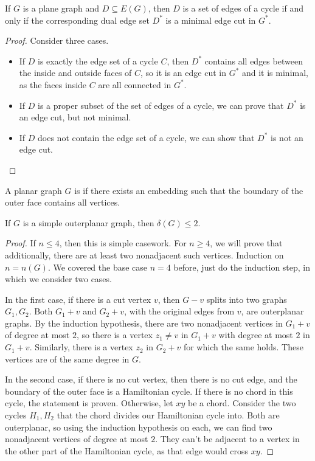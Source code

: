 \begin{theorem}
  If $G$ is a plane graph and $D \subseteq E(G)$, then $D$ is a set of edges of
  a cycle if and only if the corresponding dual edge set $D^*$ is a minimal edge
  cut in $G^*$.
\end{theorem}

\begin{proof}
  Consider three cases.
  \begin{itemize}
  \item If $D$ is exactly the edge set of a cycle $C$, then $D^*$ contains all
	edges between the inside and outside faces of $C$, so it is an edge cut in
	$G^*$ and it is minimal, as the faces inside $C$ are all connected in $G^*$.
  \item If $D$ is a proper subset of the set of edges of a cycle, we can prove
	that $D^*$ is an edge cut, but not minimal.
  \item If $D$ does not contain the edge set of a cycle, we can show that $D^*$
	is not an edge cut. \qedhere
  \end{itemize}
\end{proof}

\begin{definition}
  A planar graph $G$ is  if there exists an embedding such
  that the boundary of the outer face contains all vertices.
\end{definition}

\begin{theorem}
  If $G$ is a simple outerplanar graph, then $\delta(G) \le 2$.
\end{theorem}

\begin{proof}
  If $n \le 4$, then this is simple casework.
  For $n \ge 4$, we will prove that additionally, there are at least two
  nonadjacent such vertices.
  Induction on $n = n(G)$.
  We covered the base case $n=4$ before, just do the induction step, in which we
  consider two cases.

  In the first case, if there is a cut vertex $v$, then $G-v$ splits into two
  graphs $G_1, G_2$.
  Both $G_1 + v$ and $G_2 + v$, with the original edges from $v$, are
  outerplanar graphs.
  By the induction hypothesis, there are two nonadjacent vertices in $G_1 + v$
  of degree at most $2$, so there is a vertex $z_1 \ne v$ in $G_1 + v$ with
  degree at most $2$ in $G_1 + v$.
  Similarly, there is a vertex $z_2$ in $G_2 + v$ for which the same holds.
  These vertices are of the same degree in $G$.

  In the second case, if there is no cut vertex, then there is no cut edge, and
  the boundary of the outer face is a Hamiltonian cycle.
  If there is no chord in this cycle, the statement is proven.
  Otherwise, let $xy$ be a chord.
  Consider the two cycles $H_1, H_2$ that the chord divides our Hamiltonian
  cycle into.
  Both are outerplanar, so using the induction hypothesis on each, we can find
  two nonadjacent vertices of degree at most $2$.
  They can't be adjacent to a vertex in the other part of the Hamiltonian cycle,
  as that edge would cross $xy$.
\end{proof}

